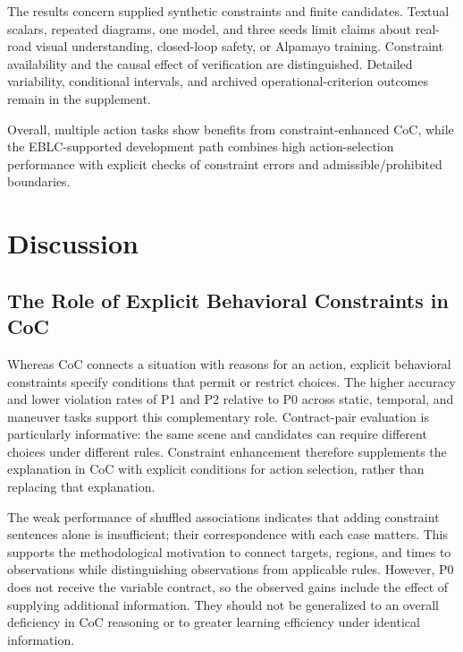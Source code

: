 \documentclass[nolineno]{ieeeaccess}
\begin{document}
The results concern supplied synthetic constraints and finite candidates. Textual scalars, repeated diagrams, one model, and three seeds limit claims about real-road visual understanding, closed-loop safety, or Alpamayo training. Constraint availability and the causal effect of verification are distinguished. Detailed variability, conditional intervals, and archived operational-criterion outcomes remain in the supplement.\par

Overall, multiple action tasks show benefits from constraint-enhanced CoC, while the EBLC-supported development path combines high action-selection performance with explicit checks of constraint errors and admissible/prohibited boundaries.\par
\clearpage
\section{Discussion}

\subsection{The Role of Explicit Behavioral Constraints in CoC}

Whereas CoC connects a situation with reasons for an action, explicit behavioral constraints specify conditions that permit or restrict choices. The higher accuracy and lower violation rates of P1 and P2 relative to P0 across static, temporal, and maneuver tasks support this complementary role. Contract-pair evaluation is particularly informative: the same scene and candidates can require different choices under different rules. Constraint enhancement therefore supplements the explanation in CoC with explicit conditions for action selection, rather than replacing that explanation.\par

The weak performance of shuffled associations indicates that adding constraint sentences alone is insufficient; their correspondence with each case matters. This supports the methodological motivation to connect targets, regions, and times to observations while distinguishing observations from applicable rules. However, P0 does not receive the variable contract, so the observed gains include the effect of supplying additional information. They should not be generalized to an overall deficiency in CoC reasoning or to greater learning efficiency under identical information.\par
\end{document}
